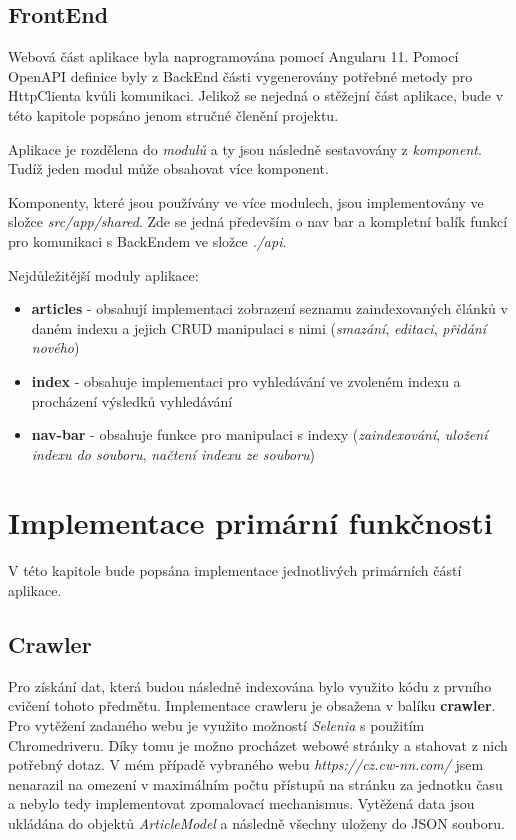 \documentclass[
12pt,
a4paper,
pdftex,
czech,
titlepage
]{report}
\begin{document}
\section{FrontEnd}
Webová část aplikace byla naprogramována pomocí Angularu 11. Pomocí OpenAPI definice byly z BackEnd části vygenerovány potřebné metody pro HttpClienta kvůli komunikaci. Jelikož se nejedná o stěžejní část aplikace, bude v této kapitole popsáno jenom stručné členění projektu.

Aplikace je rozdělena do \textit{modulů} a ty jsou následně sestavovány z \textit{komponent}. Tudíž jeden modul může obsahovat více komponent.

Komponenty, které jsou používány ve více modulech, jsou implementovány ve složce \textit{src/app/shared}. Zde se jedná především o nav bar a kompletní balík funkcí pro komunikaci s BackEndem ve složce \textit{./api}.

Nejdůležitější moduly aplikace:
\begin{itemize}
    \item \textbf{articles} - obsahují implementaci zobrazení seznamu zaindexovaných článků v daném indexu a jejich CRUD manipulaci s nimi (\textit{smazání}, \textit{editaci}, \textit{přidání nového})
    \item \textbf{index} - obsahuje implementaci pro vyhledávání ve zvoleném indexu a procházení výsledků vyhledávání
    \item \textbf{nav-bar} - obsahuje funkce pro manipulaci s indexy (\textit{zaindexování}, \textit{uložení indexu do souboru}, \textit{načtení indexu ze souboru})
\end{itemize}
\chapter{Implementace primární funkčnosti}
V této kapitole bude popsána implementace jednotlivých primárních částí aplikace.
\section{Crawler}
Pro získání dat, která budou následně indexována bylo využito kódu z prvního cvičení tohoto předmětu. Implementace crawleru je obsažena v balíku \textbf{crawler}. Pro vytěžení zadaného webu je využito možností \textit{Selenia} s použitím Chromedriveru. Díky tomu je možno procházet webowé stránky a stahovat z nich potřebný dotaz. V mém případě vybraného webu \textit{https://cz.cw-nn.com/} jsem nenarazil na omezení v maximálním počtu přístupů na stránku za jednotku času a nebylo tedy implementovat zpomalovací mechanismus. Vytěžená data jsou ukládána do objektů \textit{ArticleModel} a následně všechny uloženy do JSON souboru. 
\end{document}
